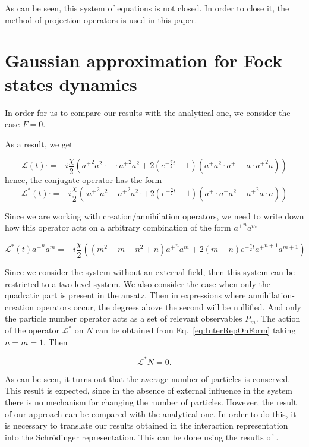 \documentclass[12pt]{article}
\theoremstyle{definition}
\def\ga {\gamma}
\begin{document}
	As can be seen, this system of equations is not closed. In order to close it, the method of projection operators is used in this paper.
	
	\section{Gaussian approximation for Fock states dynamics\label{sec:feq0}}
	
	In order for us to compare our results with the analytical one, we consider the case $F = 0$.
	
	As a result, we get
	
	\begin{equation}
		\label{eq:InterRep}
		\mathcal{L}(t)\cdot = -i\frac{\chi}{2}({a^+}^2a^2\cdot - \cdot{a^+}^2a^2 + 2   (e^{-\frac{\ga}{2}t} - 1) (a^+a^2\cdot a^+ - a\cdot {a^+}^2a) )
	\end{equation}
	hence, the conjugate operator has the form
	\begin{equation}
		\label{eq:InterRepCon}
		\mathcal{L}^*(t)\cdot = -i\frac{\chi}{2}(\cdot{a^+}^2a^2 - {a^+}^2a^2\cdot + 2   (e^{-\frac{\ga}{2}t} - 1) ( a^+\cdot a^+a^2 - {a^+}^2a\cdot a) )
	\end{equation}
	
	Since we are working with creation/annihilation operators, we need to write down how this operator acts on a arbitrary combination of the form ${a^+}^na^m$
	
	\begin{equation}
		\label{eq:InterRepOnForm}
		\mathcal{L}^*(t){a^+}^na^m = -i\frac{\chi}{2}((m^2 - m - n^2 + n){a^+}^na^m + 2 (m - n) e^{-\frac{\ga}{2}t} {a^+}^{n + 1} a^{m + 1})
	\end{equation}
	
	Since we consider the system without an external field, then this system can be restricted to a two-level system. We also consider the case when only the quadratic part is present in the ansatz. Then in expressions where annihilation-creation operators occur, the degrees above the second will be nullified. And only the particle number operator acts as a set of relevant observables $P_m$. The action of the operator $\mathcal{L}^*$ on $N$ can be obtained from  Eq.~\eqref{eq:InterRepOnForm} taking $n = m = 1$. Then
	
	\begin{equation*}
		\mathcal{L}^*N = 0.
	\end{equation*}
	
	As can be seen, it turns out that the average number of particles is conserved. This result is expected, since in the absence of external influence in the system there is no mechanism for changing the number of particles. However, the result of our approach can be compared with the analytical one. In order to do this, it is necessary to translate our results obtained in the interaction representation into the Schrödinger representation. This can be done using the results of \cite{Dis}.
	
\end{document}
